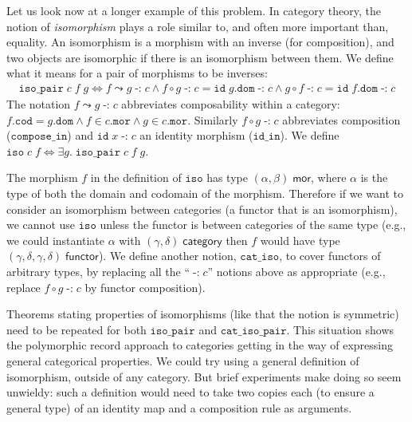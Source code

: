 \documentclass[twoside,titlepage,11pt]{article}
\begin{document}
Let us look now at a longer example of this problem.
In category theory, the notion of \emph{isomorphism} plays a role similar to, and often more important than, equality.
An isomorphism is a morphism with an inverse (for composition), and two objects are isomorphic if there is an isomorphism between them.
We define what it means for a pair of morphisms to be inverses:
\begin{align*}
\mathtt{iso\_pair}\;c\;f\;g\iff f\leadsto g\operatorname{\mathtt{-:}}c\land f\circ g\operatorname{\mathtt{-:}}c=\mathtt{id}\;g.\mathtt{dom}\operatorname{\mathtt{-:}}c\land g\circ f\operatorname{\mathtt{-:}}c=\mathtt{id}\;f.\mathtt{dom}\operatorname{\mathtt{-:}}c
\end{align*}
The notation $f\leadsto g\operatorname{\mathtt{-:}}c$ abbreviates composability within a category: $f.\mathtt{cod}=g.\mathtt{dom}\land f\in c.\mathtt{mor}\land g\in c.\mathtt{mor}$.
Similarly $f\circ g\operatorname{\mathtt{-:}}c$ abbreviates composition ($\mathtt{compose\_in}$) and $\mathtt{id}\;x\operatorname{-:}c$ an identity morphism ($\mathtt{id\_in}$).
We define $\mathtt{iso}\;c\;f \iff\exists{g}.\;\mathtt{iso\_pair}\;c\;f\;g$.

The morphism $f$ in the definition of $\mathtt{iso}$ has type $(\alpha,\beta)\;\mathsf{mor}$, where $\alpha$ is the type of both the domain and codomain of the morphism.
Therefore if we want to consider an isomorphism between categories (a functor that is an isomorphism), we cannot use $\mathtt{iso}$ unless the functor is between categories of the same type (e.g., we could instantiate $\alpha$ with $(\gamma,\delta)\;\mathsf{category}$ then $f$ would have type $(\gamma,\delta,\gamma,\delta)\;\mathsf{functor}$).
We define another notion, $\mathtt{cat\_iso}$, to cover functors of arbitrary types, by replacing all the ``$\operatorname{\mathtt{-:}}c$'' notions above as appropriate (e.g., replace $f\circ g\operatorname{\mathtt{-:}}c$ by functor composition).

Theorems stating properties of isomorphisms (like that the notion is symmetric) need to be repeated for both $\mathtt{iso\_pair}$ and $\mathtt{cat\_iso\_pair}$. 
This situation shows the polymorphic record approach to categories getting in the way of expressing general categorical properties.
We could try using a general definition of isomorphism, outside of any category.
But brief experiments make doing so seem unwieldy: such a definition would need to take two copies each (to ensure a general type) of an identity map and a composition rule as arguments.
\end{document}
